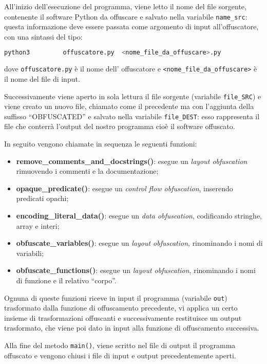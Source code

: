 \documentclass[a4paper,oneside,openright,titlepage,10pt,footinclude,headinclude]{scrbook}
\begin{document}
All'inizio dell'esecuzione del programma, viene letto il nome del file sorgente, contenente il software Python da offuscare e salvato nella variabile \texttt{name\_src}: questa informazione deve essere passata come argomento di input all'offuscatore, con una sintassi del tipo:
\begin{graybox}
\begin{lstlisting}[language=bash,basicstyle=\fontsize{10}{9}\selectfont,]
python3  		offuscatore.py 	<nome_file_da_offuscare>.py
\end{lstlisting}
\end{graybox}
\noindent dove \texttt{offuscatore.py} è il nome dell' offuscatore e \texttt{<nome\_file\_da\_offuscare>} è il nome del file di input.

Successivamente viene aperto in sola lettura il file sorgente (variabile \texttt{file\_SRC}) e viene creato un nuovo file, chiamato come il precedente ma con l'aggiunta della suffisso ``OBFUSCATED''  e salvato nella variabile \texttt{file\_DEST}: esso rappresenta il file che conterrà l'output del nostro programma cioè il software offuscato.\smallskip

\noindent In seguito vengono chiamate in sequenza le seguenti funzioni:
\begin{itemize}
\item
\textbf{remove\_comments\_and\_docstrings()}: esegue un \emph{layout obfuscation} rimuovendo i commenti e la documentazione;
\item
\textbf{opaque\_predicate()}: esegue un \emph{control flow obfuscation}, inserendo predicati opachi; 
\item
\textbf{encoding\_literal\_data()}: esegue un \emph{data obfuscation}, codificando stringhe, array e interi;
\item
\textbf{obfuscate\_variables()}: esegue un \emph{layout obfuscation}, rinominando i nomi di variabili;
  \item
\textbf{obfuscate\_functions()}: esegue un \emph{layout obfuscation}, rinominando i nomi di funzione e il relativo ``corpo''.
\end{itemize}
Ognuna di queste funzioni riceve in input il programma (variabile \texttt{out}) trasformato dalla funzione di offuscamento precedente, vi applica un certo insieme di trasformazioni offuscanti e successivamente restituisce un output trasformato, che viene poi dato in input alla funzione di offuscamento successiva.\smallskip

Alla fine del metodo \texttt{main()}, viene scritto nel file di output il programma offuscato  e vengono chiusi i file di input e output precedentemente aperti.
\end{document}
